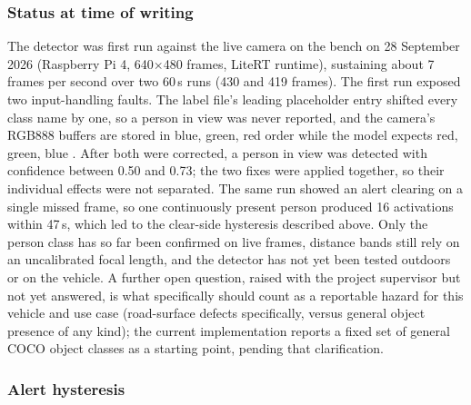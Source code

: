\subsubsection*{Status at time of writing}

The detector was first run against the live camera on the bench on 28 September 2026 (Raspberry Pi 4, 640$\times$480 frames, LiteRT runtime), sustaining about 7 frames per second over two 60\,s runs (430 and 419 frames). The first run exposed two input-handling faults. The label file's leading placeholder entry shifted every class name by one, so a person in view was never reported, and the camera's RGB888 buffers are stored in blue, green, red order while the model expects red, green, blue \cite{picamera2manual}. After both were corrected, a person in view was detected with confidence between 0.50 and 0.73; the two fixes were applied together, so their individual effects were not separated. The same run showed an alert clearing on a single missed frame, so one continuously present person produced 16 activations within 47\,s, which led to the clear-side hysteresis described above. Only the person class has so far been confirmed on live frames, distance bands still rely on an uncalibrated focal length, and the detector has not yet been tested outdoors or on the vehicle. A further open question, raised with the project supervisor but not yet answered, is what specifically should count as a reportable hazard for this vehicle and use case (road-surface defects specifically, versus general object presence of any kind); the current implementation reports a fixed set of general COCO object classes as a starting point, pending that clarification.

\subsubsection*{Alert hysteresis}

